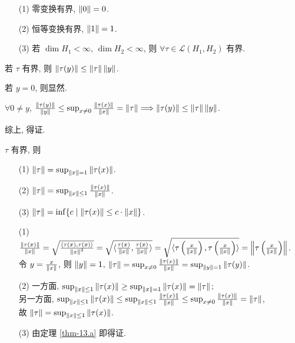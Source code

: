 \documentclass{note}
\begin{document}
\begin{eg}
    \begin{itemize}
        \item[(1)] 零变换有界, $\left\lVert0\right\rVert=0$.
        \item[(2)] 恒等变换有界, $\left\lVert1\right\rVert=1$.
        \item[(3)] 若 $\dim H_1<\infty$, $\dim H_2<\infty$, 则 $\forall\tau\in\mathcal{L}(H_1,H_2)$ 有界.
    \end{itemize}
\end{eg}

\begin{thm}\label{thm-13.a}
    若 $\tau$ 有界, 则 $\left\lVert\tau(y)\right\rVert\leq\left\lVert\tau\right\rVert\left\lVert y\right\rVert$.
\end{thm}
\begin{pf}
    若 $y=0$, 则显然.

    $\forall 0\neq y$, $\frac{\left\lVert\tau(y)\right\rVert}{\left\lVert y\right\rVert}\leq\sup_{x\neq 0}\frac{\left\lVert\tau(x)\right\rVert}{\left\lVert x\right\rVert}=\left\lVert\tau\right\rVert\Longrightarrow\left\lVert\tau(y)\right\rVert\leq\left\lVert\tau\right\rVert\left\lVert y\right\rVert$.

    综上, 得证.
\end{pf}

\begin{thm}[(课本定理 13.30)]
    $\tau$ 有界, 则
    \begin{itemize}
        \item[(1)] $\left\lVert\tau\right\rVert=\sup_{\left\lVert x\right\rVert=1}\left\lVert\tau(x)\right\rVert$.
        \item[(2)] $\left\lVert\tau\right\rVert=\sup_{\left\lVert x\right\rVert\leq 1}\frac{\left\lVert\tau(x)\right\rVert}{\left\lVert x\right\rVert}$.
        \item[(3)] $\left\lVert\tau\right\rVert=\inf\{c\mid\left\lVert\tau(x)\right\rVert\leq c\cdot\left\lVert x\right\rVert\}$.
    \end{itemize}
\end{thm}
\begin{pf}
    \begin{itemize}
        \item[(1)] $\frac{\left\lVert\tau(x)\right\rVert}{\left\lVert x\right\rVert}=\sqrt{\frac{\langle\tau(x),\tau(x)\rangle}{\left\lVert x\right\rVert^2}}=\sqrt{\langle\frac{\tau(x)}{\left\lVert x\right\rVert},\frac{\tau(x)}{\left\lVert x\right\rVert}\rangle}=\sqrt{\langle\tau\left(\frac{x}{\left\lVert x\right\rVert}\right),\tau\left(\frac{x}{\left\lVert x\right\rVert}\right)\rangle}=\left\lVert\tau\left(\frac{x}{\left\lVert x\right\rVert}\right)\right\rVert$.\\
        令 $y=\frac{x}{\left\lVert x\right\rVert}$, 则 $\left\lVert y\right\rVert=1$, $\left\lVert\tau\right\rVert=\sup_{x\neq 0}\frac{\left\lVert\tau(x)\right\rVert}{\left\lVert x\right\rVert}=\sup_{\left\lVert y\right\rVert=1}\left\lVert\tau(y)\right\rVert$.
        \item[(2)] 一方面, $\sup_{\left\lVert x\right\rVert\leq 1}\left\lVert\tau(x)\right\rVert\geq\sup_{\left\lVert x\right\rVert=1}\left\lVert\tau(x)\right\rVert=\left\lVert\tau\right\rVert$;\\
        另一方面, $\sup_{\left\lVert x\right\rVert\leq 1}\left\lVert\tau(x)\right\rVert\leq\sup_{\left\lVert x\right\rVert\leq 1}\frac{\left\lVert\tau(x)\right\rVert}{\left\lVert x\right\rVert}\leq\sup_{x\neq 0}\frac{\left\lVert\tau(x)\right\rVert}{\left\lVert x\right\rVert}=\left\lVert\tau\right\rVert$,\\
        故 $\left\lVert\tau\right\rVert=\sup_{\left\lVert x\right\rVert\leq 1}\left\lVert\tau(x)\right\rVert$.
        \item[(3)] 由定理 \ref{thm-13.a} 即得证.
    \end{itemize}
\end{pf}
\end{document}
